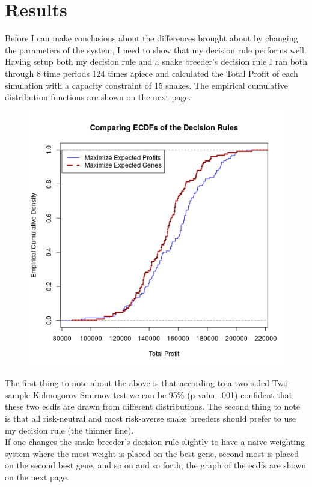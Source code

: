 \documentclass{article}
\begin{document}
	\section*{Results}
	\indent Before I can make conclusions about the differences brought about by changing the parameters of the system, I need to show that my decision rule performs well. Having setup both my decision rule and a snake breeder's decision rule I ran both through 8 time periods 124 times apiece and calculated the Total Profit of each simulation with a capacity constraint of 15 snakes. The empirical cumulative distribution functions are shown on the next page.
	\begin{figure}[H]
	\centering
	\includegraphics[width=.75\textwidth]{ECDF.png}
	\end{figure}
	The first thing to note about the above is that according to a two-sided Two-sample Kolmogorov-Smirnov test we can be 95\% (p-value .001) confident that these two ecdfs are drawn from different distributions. The second thing to note is that all risk-neutral and most risk-averse snake breeders should prefer to use my decision rule (the thinner line).\\
	\indent If one changes the snake breeder's decision rule slightly to have a naive weighting system where the most weight is placed on the best gene, second most is placed on the second best gene, and so on and so forth, the graph of the ecdfs are shown on the next page.
\end{document}
